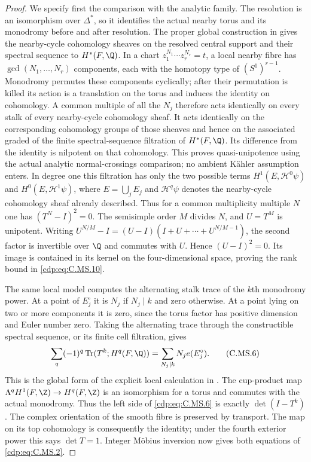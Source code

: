 \begin{proof}
We specify first the comparison with the analytic
family. The resolution is an isomorphism over
$\Delta^*$, so it identifies the actual nearby
torus and its monodromy before and after resolution.
The proper global construction in
\cite[\S2, pp.~237--243, and \S3]{ACampo1975}
gives the nearby-cycle cohomology sheaves on the
resolved central support and their spectral sequence
to $H^*(F,\Q)$. In a chart
$z_1^{N_1}\cdots z_r^{N_r}=t$, a local nearby
fibre has $\gcd(N_1,\ldots,N_r)$ components,
each with the homotopy type of $(S^1)^{r-1}$.
Monodromy permutes these components cyclically;
after their permutation is killed its action
is a translation on the torus and induces the
identity on cohomology. A common multiple of all
the $N_j$ therefore acts identically on every
stalk of every nearby-cycle cohomology sheaf.
It acts identically on the corresponding
cohomology groups of those sheaves and hence
on the associated graded of the finite
spectral-sequence filtration of $H^*(F,\Q)$.
Its difference from the identity is nilpotent
on that cohomology. This proves quasi-unipotence
using the actual analytic normal-crossings
comparison; no ambient K\"ahler assumption enters.
In degree one this filtration has only the
two possible terms $H^1(E,\mathcal H^0\psi)$
and $H^0(E,\mathcal H^1\psi)$, where
$E=\bigcup_jE_j$ and $\mathcal H^q\psi$
denotes the nearby-cycle cohomology sheaf
already described. Thus for a
common multiplicity multiple $N$ one has
$(T^N-I)^2=0$. The semisimple order $M$
divides $N$, and $U=T^M$ is unipotent.
Writing
$U^{N/M}-I=(U-I)(I+U+\cdots+U^{N/M-1})$,
the second factor is invertible over $\Q$
and commutes with $U$. Hence $(U-I)^2=0$.
Its image is contained in its kernel on
the four-dimensional space, proving
the rank bound in \eqref{cdp:eq:C.MS.10}.

The same local model computes the alternating
stalk trace of the $k$th monodromy power. At a
point of $E_j^\circ$ it is $N_j$ if $N_j\mid k$
and zero otherwise. At a point lying on two or
more components it is zero, since the torus
factor has positive dimension and Euler number
zero. Taking the alternating trace through the
constructible spectral sequence, or its finite
cell filtration, gives
\[
 \sum_q(-1)^q\operatorname{Tr}
             (T^k;H^q(F,\Q))
       =\sum_{N_j\mid k}N_j e(E_j^\circ).
 \tag{C.MS.6}\label{cdp:eq:C.MS.6}
\]
This is the global form of the explicit local
calculation in \cite[Theorem~1, p.~235,
and proof on pp.~243--244]{ACampo1975}.
The cup-product map
$\Lambda^qH^1(F,\Z)\to H^q(F,\Z)$ is an
isomorphism for a torus and commutes with the
actual monodromy. Thus the left side of
\eqref{cdp:eq:C.MS.6} is exactly $\det(I-T^k)$.
The complex orientation of the smooth fibre
is preserved by transport. The map on its
top cohomology is consequently the identity;
under the fourth exterior power this says
$\det T=1$. Integer M\"obius inversion now
gives both equations of \eqref{cdp:eq:C.MS.2}.


\end{proof}
